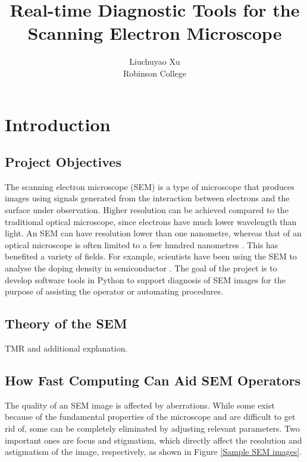 \documentclass{article}
\title{Real-time Diagnostic Tools for the Scanning Electron Microscope}
\author{Liuchuyao Xu\\Robinson College}
\begin{document}
\maketitle
\tableofcontents
\newpage

\section{Introduction}
\subsection{Project Objectives}
The scanning electron microscope (SEM) is a type of microscope that produces images using signals generated from the interaction between electrons and the surface under observation. Higher resolution can be achieved compared to the traditional optical microscope, since electrons have much lower wavelength than light. An SEM can have resolution lower than one nanometre, whereas that of an optical microscope is often limited to a few hundred nanometres \cite{SEM wiki}. This has benefited a variety of fields. For example, scientists have been using the SEM to analyse the doping density in semiconductor \cite{SEM for semiconductor}. The goal of the project is to develop software tools in Python to support diagnosis of SEM images for the purpose of assisting the operator or automating procedures.

\subsection{Theory of the SEM}
TMR and additional explanation.

\subsection{How Fast Computing Can Aid SEM Operators}
The quality of an SEM image is affected by aberrations. While some exist because of the fundamental properties of the microscope and are difficult to get rid of, some can be completely eliminated by adjusting relevant parameters. Two important ones are focus and stigmatism, which directly affect the resolution and astigmatism of the image, respectively, as shown in Figure \ref{Sample SEM images}.
\end{document}
